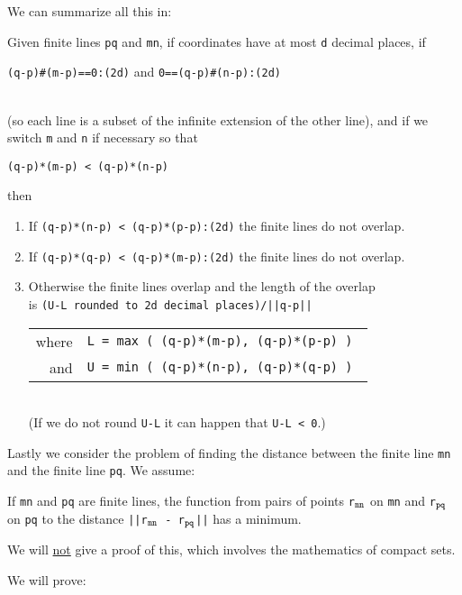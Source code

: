 \documentclass[12pt]{article}
\begin{document}
We can summarize all this in:
\begin{lemma}
Given finite lines {\tt pq} and {\tt mn},
if coordinates have at most {\tt d} decimal places, if
\\[1ex]
\centerline{{\tt (q-p)\#(m-p)==0:(2d)} and {\tt 0==(q-p)\#(n-p):(2d)}}
\\[1ex]
(so each line is a subset of the infinite extension of the other line),
and if we switch {\tt m} and {\tt n} if necessary so that \\
\centerline{\tt (q-p)*(m-p) < (q-p)*(n-p)}
then
\begin{enumerate}
\item If {\tt (q-p)*(n-p) < (q-p)*(p-p):(2d)} the finite lines do not overlap.
\item If {\tt (q-p)*(q-p) < (q-p)*(m-p):(2d)} the finite lines do not overlap.
\item Otherwise the finite lines overlap and the length of the overlap \\
is {\tt (U-L {\rm rounded to} {\tt 2d} {\rm decimal places})/||q-p||} \\
\hspace*{0.5in}\begin{tabular}{rl}
where	& \tt L = max ( (q-p)*(m-p), (q-p)*(p-p) ) \\
and	& \tt U = min ( (q-p)*(n-p), (q-p)*(q-p) ) \\
\end{tabular} \\
(If we do not round {\tt U-L} it can happen that {\tt U-L < 0}.)
\end{enumerate}
\end{lemma}


Lastly we consider the problem of finding the distance between
the finite line {\tt mn} and the finite line {\tt pq}.  We assume:

\begin{theorem}
If {\tt mn} and {\tt pq} are finite lines, the function from pairs
of points
{\tt r$_{\tt mn}$} on {\tt mn} and
{\tt r$_{\tt pq}$} on {\tt pq}  to the distance
{\tt ||r$_{\tt mn}$ - r$_{\tt pq}$||} has a minimum.
\end{theorem}

We will \underline{not} give a proof of this,
which involves the mathematics of compact sets.

We will prove:
\end{document}
